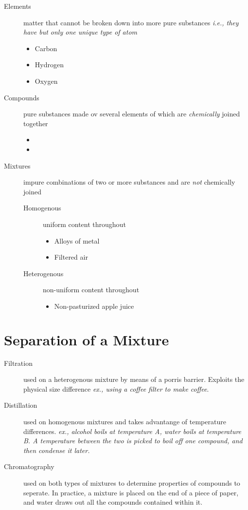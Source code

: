 \begin{description}
  \item[Elements] matter that cannot be broken down into more pure substances
    \textit{i.e., they have but only one unique type of atom}
    \begin{itemize}
      \item Carbon
      \item Hydrogen
      \item Oxygen
    \end{itemize}
  \item[Compounds] pure substances made ov several elements of which are
    \textit{chemically} joined together
    \begin{itemize}
      \item {}
      \item {}
    \end{itemize}
  \item[Mixtures] impure combinations of two or more substances and are
    \textit{not} chemically joined
    \begin{description}
      \item[Homogenous] uniform content throughout
        \begin{itemize}
          \item Alloys of metal
          \item Filtered air
        \end{itemize}
      \item[Heterogenous] non-uniform content throughout
        \begin{itemize}
          \item Non-pasturized apple juice
        \end{itemize}
    \end{description}
\end{description}

\section{Separation of a Mixture}
\begin{description}
  \item[Filtration] used on a heterogenous mixture by means of a porris barrier.
    Exploits the physical size difference \textit{ex., using a coffee filter to
    make coffee}.
  \item[Distillation] used on homogenous mixtures and takes advantange of
    temperature differences. \textit{ex., alcohol boils at temperature A, water
      boils at temperature B.  A temperature between the two is picked to boil
    off one compound, and then condense it later.}
  \item[Chromatography] used on both types of mixtures to determine properties
    of compounds to seperate.  In practice, a mixture is placed on the end of a
    piece of paper, and water draws out all the compounds contained within it.
\end{description}

